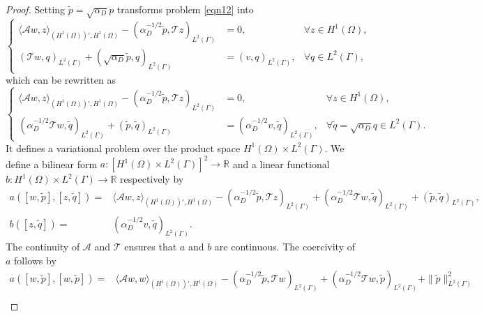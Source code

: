 \documentclass[onefignum,onetabnum]{siamart190516}
\numberwithin{equation}{section}
\begin{document}
\begin{proof}
Setting $\tilde{p} = \sqrt{\alpha_{D}} p$ transforms problem \eqref{eqn12} into
\begin{equation*}
\left\{
\begin{aligned}
\langle \mathcal{A}w, z\rangle_{(H^{1}(\Omega))', H^{1}(\Omega)} - ( \alpha_D^{-1/2}\tilde{p}, \mathcal{T}z )_{L^{2}(\Gamma)} &= 0, & \forall z \in H^{1}(\Omega), \\
(\mathcal{T}w, q)_{L^{2}(\Gamma)} + (\sqrt{\alpha_{D}} \tilde{p}, q)_{L^{2}(\Gamma)} &= (v, q)_{L^{2}(\Gamma)}, & \forall q \in L^{2}(\Gamma),
\end{aligned}
\right.
\end{equation*}
which can be rewritten as
\begin{equation}\label{eqn32}
\left\{
\begin{aligned}
\langle \mathcal{A}w, z\rangle_{(H^{1}(\Omega))', H^{1}(\Omega)} - (\alpha_D^{-1/2} \tilde{p}, \mathcal{T}z )_{L^{2}(\Gamma)} &= 0, & \forall z \in H^{1}(\Omega), \\
( \alpha_D^{-1/2}\mathcal{T}w, \tilde{q})_{L^{2}(\Gamma)} + (\tilde{p}, \tilde{q})_{L^{2}(\Gamma)} &= (\alpha_D^{-1/2} v, \tilde{q} )_{L^{2}(\Gamma)}, & \forall \tilde{q} = \sqrt{\alpha_{D}} q \in L^{2}(\Gamma).
\end{aligned}
\right.
\end{equation}
It defines a variational problem over the product space $H^{1}(\Omega) \times L^{2}(\Gamma)$.
We define a bilinear form $a: [H^{1}(\Omega) \times L^{2}(\Gamma)]^{2} \to \mathbb{R}$ and a linear functional $b: H^{1}(\Omega) \times L^{2}(\Gamma) \to \mathbb{R}$ respectively by
\begin{align*}
a\left( [w, \tilde{p}], [z, \tilde{q}] \right) =& \langle \mathcal{A}w, z \rangle_{(H^{1}(\Omega))', H^{1}(\Omega)} - (\alpha_D^{-1/2}\tilde{p}, \mathcal{T}z)_{L^{2}(\Gamma)} + (\alpha_D^{-1/2} \mathcal{T}w, \tilde{q} )_{L^{2}(\Gamma)} + (\tilde{p}, \tilde{q})_{L^{2}(\Gamma)}, \\
b\left( [z, \tilde{q}] \right) =& (\alpha_D^{-1/2} v, \tilde{q} )_{L^{2}(\Gamma)}.
\end{align*}
The continuity of $\mathcal{A}$ and $\mathcal{T}$ ensures that $a$ and $b$ are continuous.
The coercivity of $a$ follows by
\begin{align*}
a([w, \tilde{p}], [w, \tilde{p}]) =& \langle \mathcal{A}w, w \rangle_{(H^{1}(\Omega))', H^{1}(\Omega)} - (\alpha_D^{-1/2} \tilde{p}, \mathcal{T}w )_{L^{2}(\Gamma)} + (\alpha_D^{-1/2} \mathcal{T}w, \tilde{p} )_{L^{2}(\Gamma)} + \|\tilde{p}\|_{L^{2}(\Gamma)}^{2} \\

\end{align*}
\end{proof}
\end{document}
